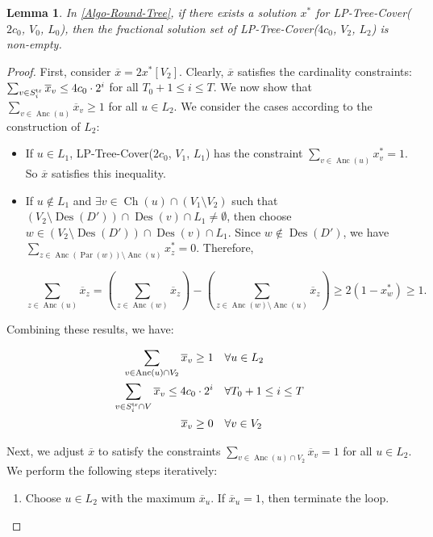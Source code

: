\documentclass[11pt,a4paper]{article} \usepackage{enumitem}
\newcommand{\assigned}[1]{[ #1 ]}
\newcommand{\trS}[1]{\ifx\relax#1\relax
    S^{\operatorname{tr}} \else
    S^{\operatorname{tr}}_{#1} \fi
}
\newcommand{\Des}{\operatorname{Des}}
\newcommand{\Ch}{\operatorname{Ch}}
\newcommand{\Anc}{\operatorname{Anc}}
\newcommand{\Par}{\operatorname{Par}}
\newtheorem{lemma}[theorem]{Lemma}
\theoremstyle{definition}
\begin{document}
\begin{lemma}\label{lem:tree-round-2}
In \cref{Algo-Round-Tree}, if there exists a solution $x^{*}$ for LP-Tree-Cover($2c_0$, $V_0$, $L_0$), then the fractional solution set of LP-Tree-Cover($4c_0$, $V_2$, $L_2$) is non-empty.
\end{lemma}
\begin{proof}
First, consider $\overline{x} = 2 x^{*}\assigned{V_2}$. Clearly, $\overline{x}$ satisfies the cardinality constraints: $\sum_{v \in \trS{i}} \overline{x}_v \leq 4c_0 \cdot 2^i$ for all $T_0 + 1 \leq i \leq T$. We now show that $\sum_{v \in \Anc(u)} \overline{x}_v \geq 1$ for all $u \in L_2$. We consider the cases according to the construction of $L_2$:
\begin{itemize}
\item If $u \in L_1$, LP-Tree-Cover($2c_0$, $V_1$, $L_1$) has the constraint $\sum_{v \in \Anc(u)} x^{*}_v = 1$. So $\overline{x}$ satisfies this inequality.

\item If $u \notin L_1$ and $\exists v \in \Ch(u) \cap (V_1 \setminus V_2)$ such that $(V_2 \setminus \Des(D')) \cap \Des(v) \cap L_1 \neq \emptyset$, then choose $w \in (V_2 \setminus \Des(D')) \cap \Des(v) \cap L_1$. Since $w \notin \Des(D')$, we have $\sum_{z \in \Anc(\Par(w)) \setminus \Anc(u)} x^{*}_z = 0$. Therefore,

$$\sum_{z \in \Anc(u)} \overline{x}_z = \left(\sum_{z \in \Anc(w)} \overline{x}_z\right) - \left(\sum_{z \in \Anc(w) \setminus \Anc(u)} \overline{x}_z\right) \geq 2(1 - x^{*}_w) \geq 1.$$
\end{itemize}
Combining these results, we have:

\begin{equation}
\begin{aligned}
\sum_{v \in \Anc(u) \cap V_2} \overline{x}_v \geq 1 && & \forall u \in L_2 \\
\sum_{v \in \trS{i} \cap V} \overline{x}_v \leq 4c_0 \cdot 2^i && & \forall T_0 + 1 \leq i \leq T \\
\overline{x}_v \geq 0 && & \forall v \in V_2
\end{aligned}
\end{equation}

Next, we adjust $\overline{x}$ to satisfy the constraints $\sum_{v \in \Anc(u) \cap V_2} \overline{x}_v = 1$ for all $u \in L_2$. We perform the following steps iteratively:
\begin{enumerate}
\item Choose $u \in L_2$ with the maximum $\overline{x}_u$. If $\overline{x}_u = 1$, then terminate the loop.


\end{enumerate}
\end{proof}
\end{document}
